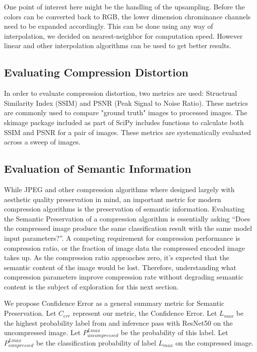 One point of interest here might be the handling of the upsampling. Before the colors can be converted back to RGB, the lower dimension chrominance channels need to be expanded accordingly. This can be done using any way of interpolation, we decided on nearest-neighbor for computation speed. However linear and other interpolation algorithms can be used to get better results.

\subsection{Evaluating Compression Distortion}

In order to evaluate compression distortion, two metrics are used: Structrual Similarity Index (SSIM) and PSNR (Peak Signal to Noise Ratio). These metrics are commonly used to compare "ground truth" images to processed images. \cite{wang2004image}\cite{psnr} The skimage package included as part of SciPy includes functions to calculate both SSIM and PSNR for a pair of images. These metrics are systematically evaluated across a sweep of images.

\subsection{Evaluation of Semantic Information}

While JPEG and other compression algorithms where designed largely with aesthetic quality preservation in mind, an important metric for modern compression algorithms is the preservation of semantic information. 
Evaluating the Semantic Preservation of a compression algorithm is essentially asking \enquote {Does the compressed image produce the same classification result with the same model input parameters?}. A competing requirement for compression performance is compression ratio, or the fraction of image data the compressed encoded image takes up. As the compression ratio approaches zero, it's expected that the semantic content of the image would be lost. Therefore, understanding what compression parameters improve compression rate without degrading semantic content is the subject of exploration for this next section.

We propose Confidence Error as a general summary metric for Semantic Preservation. Let $C_{err}$ represent our metric, the Confidence Error. Let $L_{max}$ be the highest probability label from and inference pass with ResNet50 on the uncompressed image. Let $P^{Lmax}_{uncompressed}$ be the probability of this label. Let $P^{Lmax}_{compressed}$ be the classification probability of label $L_{max}$ on the compressed image.

